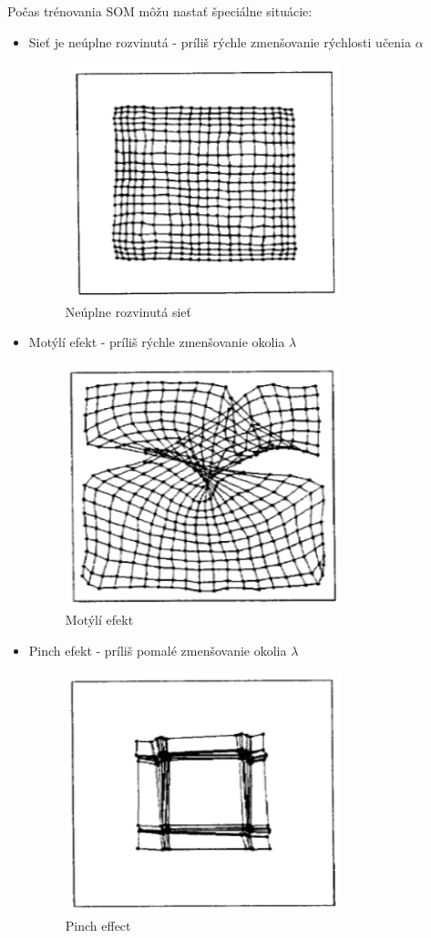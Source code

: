 Počas trénovania SOM môžu nastať špeciálne situácie:

\begin{itemize}
	\item Sieť je neúplne rozvinutá - príliš rýchle zmenšovanie rýchlosti učenia $\alpha$
	\begin{figure}[H]
		\caption{Neúplne rozvinutá sieť}
		\centering
		\includegraphics[width=8cm]{assets/too_fast}
	\end{figure}
	
	\item Motýlí efekt - príliš rýchle zmenšovanie okolia $\lambda$
	\begin{figure}[H]
		\caption{Motýlí efekt}
		\centering
		\includegraphics[width=8cm]{assets/butterfly_effect}
	\end{figure}
	
	\item Pinch efekt - príliš pomalé zmenšovanie okolia $\lambda$
	\begin{figure}[H]
		\caption{Pinch effect}
		\centering
		\includegraphics[width=8cm]{assets/pinch_effect}
	\end{figure}
\end{itemize}




